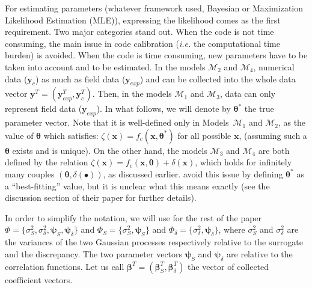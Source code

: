 \documentclass[soumission]{jsfds}
\edef\hc{\string: }
\begin{document}
For estimating parameters (whatever framework used, Bayesian or Maximization Likelihood Estimation (MLE)), expressing the likelihood comes as the first requirement. Two major categories stand out. When the code is not time consuming, the main issue in code calibration (\textit{i.e.} the computational time burden) is avoided. When the code is time consuming, new parameters have to be taken into account and to be estimated. In the models $\mathcal{M}_2$ and $\mathcal{M}_4$, numerical data ($\boldsymbol{y}_c$) as much as field data ($\boldsymbol{y}_{exp}$) and can be collected into the whole data vector $\boldsymbol{y}^T=(\boldsymbol{y}_{exp}^T,\boldsymbol{y}_c^T)$. Then, in the models $\mathcal{M}_1$ and $\mathcal{M}_3$, data can only represent field data ($\boldsymbol{y}_{exp}$).
In what follows, we will denote by $\boldsymbol{\theta}^*$ the true parameter vector.
Note that it is well-defined only in Models~$\mathcal{M}_1$ and $\mathcal{M}_2$, as the value of $\boldsymbol{\theta}$ which satisfies\hc $\zeta(\boldsymbol{x})=f_c(\boldsymbol{x},\boldsymbol{\theta}^*)$ for all possible $\boldsymbol{x}$, (assuming such a $\boldsymbol{\theta}$ exists and is unique). On the other hand, the models $\mathcal{M}_3$ and $\mathcal{M}_4$ are both defined by the relation $\zeta(\boldsymbol{x})=f_c(\boldsymbol{x},\boldsymbol{\theta})+\delta(\boldsymbol{x})$, which holds for infinitely many couples $(\boldsymbol{\theta},\delta(\bullet))$, as discussed earlier. \citet{kennedy2001} avoid this issue by defining $\boldsymbol{\theta}^*$ as a ``best-fitting'' value, but it is unclear what this means exactly (see the discussion section of their paper for further details).\newline


In order to simplify the notation, we will use for the rest of the paper $\Phi=\{\sigma_S^2,\sigma_{\delta}^2,\boldsymbol{\psi}_S,\boldsymbol{\psi}_{\delta}\}$ and $\Phi_S=\{\sigma_S^2,\boldsymbol{\psi}_S\}$ and $\Phi_{\delta}=\{\sigma_{\delta}^2,\boldsymbol{\psi}_{\delta}\}$, where $\sigma_S^2$ and $\sigma_{\delta}^2$ are the variances of the two Gaussian processes respectively relative to the surrogate and the discrepancy. The two parameter vectors $\boldsymbol{\psi}_S$ and $\boldsymbol{\psi}_{\delta}$ are relative to the correlation functions. Let us call $\boldsymbol{\beta}^T=(\boldsymbol{\beta}_S^T,\boldsymbol{\beta}_{\delta}^T)$ the vector of collected coefficient vectors.\newline
\end{document}
